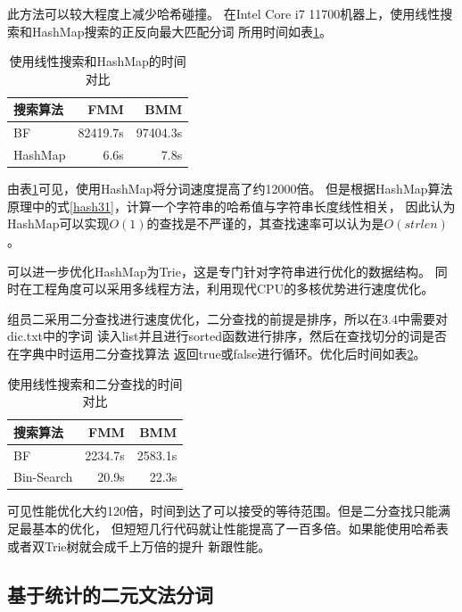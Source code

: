 此方法可以较大程度上减少哈希碰撞\citep{bajracharyareview}。
在Intel Core i7 11700机器上，使用线性搜索和HashMap搜索的正反向最大匹配分词
所用时间如表\ref{plain_vs_hashmap_time}。

\begin{table}[H]
  \centering
  \begin{tabular}{lrr}
    \hline
    \textbf{搜索算法} & \textbf{FMM} & \textbf{BMM} \\
    \hline
    BF                & 82419.7s     & 97404.3s     \\
    HashMap           & 6.6s         & 7.8s         \\
    \hline
  \end{tabular}
  \caption{使用线性搜索和HashMap的时间对比}
  \label{plain_vs_hashmap_time}
\end{table}

由表\ref{plain_vs_hashmap_time}可见，使用HashMap将分词速度提高了约12000倍。
但是根据HashMap算法原理中的式\ref{hash31}，计算一个字符串的哈希值与字符串长度线性相关，
因此认为HashMap可以实现$O(1)$的查找是不严谨的，其查找速率可以认为是$O(strlen)$。

可以进一步优化HashMap为Trie，这是专门针对字符串进行优化的数据结构\citep{bodon2003trie}。
同时在工程角度可以采用多线程方法，利用现代CPU的多核优势进行速度优化。

组员二采用二分查找进行速度优化，二分查找的前提是排序，所以在3.4中需要对dic.txt中的字词
读入list并且进行sorted函数进行排序，然后在查找切分的词是否在字典中时运用二分查找算法
返回true或false进行循环。优化后时间如表\ref{plain_vs_hashmap_time_zjb}。

\begin{table}[H]
  \centering
  \begin{tabular}{lrr}
    \hline
    \textbf{搜索算法} & \textbf{FMM} & \textbf{BMM} \\
    \hline
    BF                & 2234.7s      & 2583.1s      \\
    Bin-Search        & 20.9s        & 22.3s        \\
    \hline
  \end{tabular}
  \caption{使用线性搜索和二分查找的时间对比}
  \label{plain_vs_hashmap_time_zjb}
\end{table}

可见性能优化大约120倍，时间到达了可以接受的等待范围。但是二分查找只能满足最基本的优化，
但短短几行代码就让性能提高了一百多倍。如果能使用哈希表或者双Trie树就会成千上万倍的提升
新跟性能。

\subsection{基于统计的二元文法分词}

